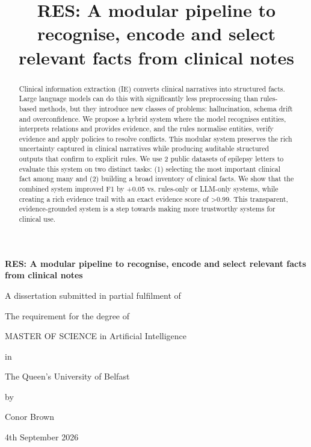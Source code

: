 \documentclass[conference]{IEEEtran}
\begin{document}
\begin{titlepage}
    \centering

    {\Huge\bfseries RES: A modular pipeline to recognise, encode and select relevant facts from clinical notes\par}
    \vspace{2cm}

    {\large
    A dissertation submitted in partial fulfilment of\par
    The requirement for the degree of\par
    MASTER OF SCIENCE in Artificial Intelligence\par
    in\par
    The Queen’s University of Belfast\par
    by\par
    Conor Brown\par
    4th September 2026
    }
\end{titlepage}


\title{RES: A modular pipeline to recognise, encode and select relevant facts from clinical notes\\}



\maketitle

\begin{abstract}
Clinical information extraction (IE) converts clinical 
narratives into structured facts. Large language models can 
do this with significantly less preprocessing than rules-based 
methods, but they introduce new classes of problems: 
hallucination, schema drift and overconfidence. We propose 
a hybrid system where the model recognises entities, interprets 
relations and provides evidence, and the rules normalise 
entities, verify evidence and apply policies to resolve conflicts. 
This modular system preserves the rich uncertainty captured 
in clinical narratives while producing auditable structured 
outputs that confirm to explicit rules. We use 2 public datasets 
of epilepsy letters to evaluate this system on two distinct tasks: 
(1) selecting the most important clinical fact among many and 
(2) building a broad inventory of clinical facts. We show that 
the combined system improved F1 by +0.05 vs. rules-only or 
LLM-only systems, while creating a rich evidence trail with an 
exact evidence score of >0.99. This transparent, 
evidence-grounded system is a step towards making more 
trustworthy systems for clinical use.
\end{abstract}
\end{document}
